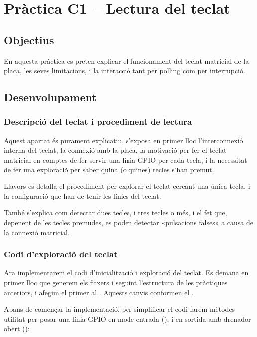 \chapter{\label{ch:c1} Pràctica C1 -- Lectura del teclat}

\section{Objectius}

En aquesta pràctica es preten explicar el funcionament del teclat matricial de
la placa, les seves limitacions, i la interacció tant per polling com per interrupció.

\section{Desenvolupament}


\subsection{Descripció del teclat i procediment de lectura}

Aquest apartat és purament explicatiu, s'exposa en primer lloc l'interconnexió interna
del teclat, la connexió amb la placa, la motivació per fer el teclat matricial en comptes
de fer servir una línia GPIO per cada tecla, i la necessitat de fer una exploració
per saber quina (o quines) tecles s'han premut.

Llavors es detalla el procediment per explorar el teclat cercant una única tecla,
i la configuració que han de tenir les línies del teclat.

També s'explica com detectar dues tecles, i tres tecles o més, i el fet que, depenent
de les tecles premudes, es poden detectar «pulsacions falses» a causa de la connexió matricial.


\subsection{Codi d'exploració del teclat}

Ara implementarem el codi d'inicialització i exploració del teclat.
Es demana en primer lloc que generem els fitxers  i 
seguint l'estructura de les pràctiques anteriors, i afegim el primer al .
Aquests canvis conformen el .

\voluntari
Abans de començar la implementació, per simplificar el codi farem mètodes utilitat
per posar una línia GPIO en mode entrada (), i en sortida amb
drenador obert ():

